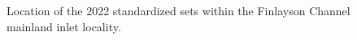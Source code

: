 \documentclass[12pt]{article}\usepackage[]{graphicx}\usepackage[]{color}
\begin{document}
\begin{figure}[htb]

{\centering {} 

}

\caption{Location of the 2022 standardized sets within the Finlayson Channel mainland inlet locality.}\label{fig:figure4}
\end{figure}
\clearpage
\end{document}
